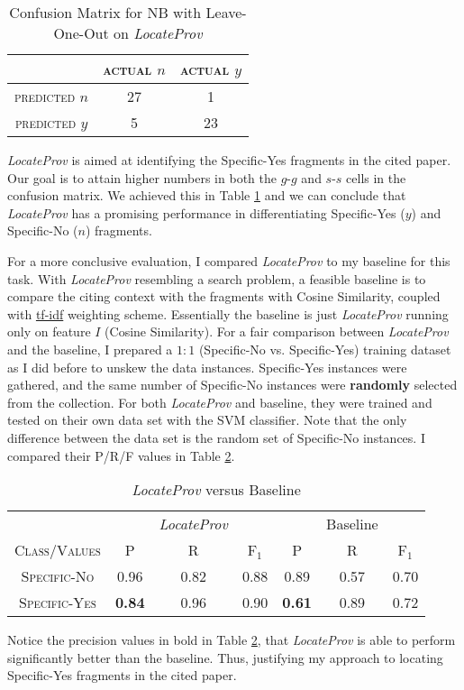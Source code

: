 \begin{table}[h]
	\center
	\begin{tabular}{ c | c  c }
		 & \textsc{actual $n$} & \textsc{actual $y$} \\
		\hline
		\textsc{predicted $n$} 	& 27 & 1 \\
		\textsc{predicted $y$}		& 5 & 23
	\end{tabular}
	\caption{Confusion Matrix for NB with Leave-One-Out on {\it LocateProv}}
	\label{tab:secondnbconfusionmatrix}
\end{table}
{\it LocateProv} is aimed at identifying the Specific-Yes fragments in the cited paper. Our goal is to attain higher numbers in both the $g$-$g$ and $s$-$s$ cells in the confusion matrix. We achieved this in Table \ref{tab:secondnbconfusionmatrix} and we can conclude that {\it LocateProv} has a promising performance in differentiating Specific-Yes ($y$) and Specific-No ($n$) fragments.

For a more conclusive evaluation, I compared {\it LocateProv} to my baseline for this task. With {\it LocateProv} resembling a search problem, a feasible baseline is to compare the citing context with the fragments with Cosine Similarity, coupled with \url{tf-idf} \cite{irtextbook} weighting scheme. Essentially the baseline is just {\it LocateProv} running only on feature $I$ (Cosine Similarity). For a fair comparison between {\it LocateProv} and the baseline, I prepared a $1:1$ (Specific-No vs. Specific-Yes) training dataset as I did before to unskew the data instances. Specific-Yes instances were gathered, and the same number of Specific-No instances were {\bf randomly} selected from the collection. For both {\it LocateProv} and baseline, they were trained and tested on their own data set with the SVM classifier. Note that the only difference between the data set is the random set of Specific-No instances. I compared their P/R/F values in Table \ref{tab:locateprov_vs_baseline}.

\begin{table}[h]
	\center
	\begin{tabular}{ c | c  c  c | c c c }
		& & {\it LocateProv} & & & Baseline \\
		\textsc{Class/Values} & \textsc{P} & \textsc{R} & \textsc{F$_1$} & \textsc{P} & \textsc{R} & \textsc{F$_1$}  \\
		\hline
		\textsc{Specific-No} 			& 0.96  &    0.82   &   0.88 & 0.89   &   0.57   &   0.70 \\
		\textsc{Specific-Yes} 			& {\bf 0.84}  &    0.96   &   0.90 & {\bf 0.61}   &   0.89   &   0.72 \\
	\end{tabular}
	\caption{{\it LocateProv} versus Baseline}
	\label{tab:locateprov_vs_baseline}
\end{table}
Notice the precision values in bold in Table \ref{tab:locateprov_vs_baseline}, that {\it LocateProv} is able to perform significantly better than the baseline. Thus, justifying my approach to locating Specific-Yes fragments in the cited paper.